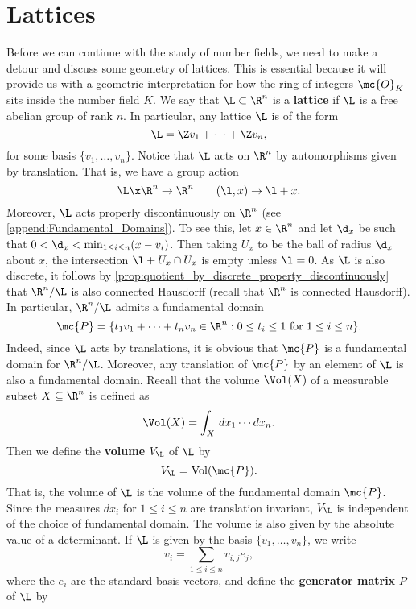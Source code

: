   \section{Lattices}
    Before we can continue with the study of number fields, we need to make a detour and discuss some geometry of lattices. This is essential because it will provide us with a geometric interpretation for how the ring of integers $\mc{O}_{K}$ sits inside the number field $K$. We say that $\L \subset \R^{n}$ is a \textbf{lattice} if $\L$ is a free abelian group of rank $n$. In particular, any lattice $\L$ is of the form
    \[
      \L = \Z v_{1}+\cdots+\Z v_{n},
    \]
    for some basis $\{v_{1},\ldots,v_{n}\}$. Notice that $\L$ acts on $\R^{n}$ by automorphisms given by translation. That is, we have a group action
    \[
      \L \x \R^{n} \to \R^{n} \qquad (\l,x) \to \l+x.
    \]
    Moreover, $\L$ acts properly discontinuously on $\R^{n}$ (see \cref{append:Fundamental_Domains}). To see this, let $x \in \R^{n}$ and let $\d_{x}$ be such that $0 < \d_{x} < \min_{1 \le i \le n}(x-v_{i})$. Then taking $U_{x}$ to be the ball of radius $\d_{x}$ about $x$, the intersection $\l+U_{x} \cap U_{x}$ is empty unless $\l = 0$. As $\L$ is also discrete, it follows by \cref{prop:quotient_by_discrete_property_discontinuously} that $\R^{n}/\L$ is also connected Hausdorff (recall that $\R^{n}$ is connected Hausdorff). In particular, $\R^{n}/\L$ admits a fundamental domain
    \[
      \mc{P} = \{t_{1}v_{1}+\cdots+t_{n}v_{n} \in \R^{n}:\text{$0 \le t_{i} \le 1$ for $1 \le i \le n$}\}.
    \]
    Indeed, since $\L$ acts by translations, it is obvious that $\mc{P}$ is a fundamental domain for $\R^{n}/\L$. Moreover, any translation of $\mc{P}$ by an element of $\L$ is also a fundamental domain. Recall that the volume $\Vol(X)$ of a measurable subset $X \subseteq \R^{n}$ is defined as
    \[
      \Vol(X) = \int_{X}\,dx_{1} \cdots dx_{n}.
    \]
    Then we define the \textbf{volume} $V_{\L}$ of $\L$ by
    \[
      V_{\L} = \mathrm{Vol}(\mc{P}).
    \]
    That is, the volume of $\L$ is the volume of the fundamental domain $\mc{P}$. Since the measures $dx_{i}$ for $1 \le i \le n$ are translation invariant, $V_{\L}$ is independent of the choice of fundamental domain. The volume is also given by the absolute value of a determinant. If $\L$ is given by the basis $\{v_{1},\ldots,v_{n}\}$, we write
    \[
      v_{i} = \sum_{1 \le i \le n}v_{i,j}e_{j},
    \]
    where the $e_{i}$ are the standard basis vectors, and define the \textbf{generator matrix} $P$ of $\L$ by
